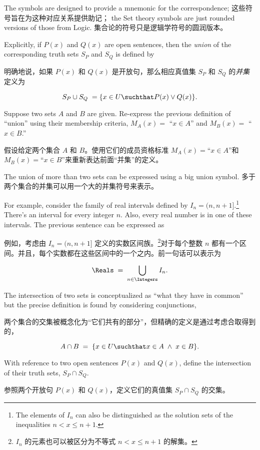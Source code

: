 The symbols are 
designed to provide a mnemonic for the correspondence;
这些符号旨在为这种对应关系提供助记；
the Set theory
symbols are just rounded versions of those from Logic.
集合论的符号只是逻辑学符号的圆润版本。

Explicitly, if $P(x)$ and $Q(x)$ are open sentences, then
the \emph{union} of the corresponding truth sets $S_P$ and $S_Q$
is defined by 

明确地说，如果 $P(x)$ 和 $Q(x)$ 是开放句，那么相应真值集 $S_P$ 和 $S_Q$ 的\emph{并集}定义为

\[ S_P \cup S_Q \; = \{ x \in U \suchthat P(x) \lor Q(x) \}. \]

\begin{exer}
Suppose two sets $A$ and $B$ are given.
Re-express the previous
definition of ``union'' using their membership criteria, $M_A(x) =$
``$x \in A$'' and $M_B(x) = $ ``$x \in B$.''

假设给定两个集合 $A$ 和 $B$。使用它们的成员资格标准 $M_A(x) = $“$x \in A$”和 $M_B(x) = $“$x \in B$”来重新表达前面“并集”的定义。
\end{exer}

The union of more than two sets can be expressed using a big union
symbol.
多于两个集合的并集可以用一个大的并集符号来表示。

For example, consider the family of real intervals defined
by $I_n = (n,n+1]$.\footnote{The elements %
of $I_n$ can also be distinguished as the solution sets of %
the inequalities $n < x \leq n+1$.}    
There's an interval for every integer $n$.  Also, every real number is in
one of these intervals.  The previous sentence can be expressed as

例如，考虑由 $I_n = (n,n+1]$ 定义的实数区间族。\footnote{$I_n$ 的元素也可以被区分为不等式 $n < x \leq n+1$ 的解集。}对于每个整数 $n$ 都有一个区间。并且，每个实数都在这些区间中的一个之内。前一句话可以表示为

\[ \Reals \; = \; \bigcup_{n\in\Integers} I_n. \]

The intersection of two sets is conceptualized as ``what they have in common''
but the precise definition is found by considering conjunctions,  

两个集合的交集被概念化为“它们共有的部分”，但精确的定义是通过考虑合取得到的，

\[ A \cap B \; = \; \{ x \in U \suchthat x \in A \; \land \; x \in B \}. \]

\begin{exer} 
With reference to two open sentences $P(x)$ and $Q(x)$, define the
intersection of their truth sets, $S_P \cap S_Q$.

参照两个开放句 $P(x)$ 和 $Q(x)$，定义它们的真值集 $S_P \cap S_Q$ 的交集。
\end{exer}

